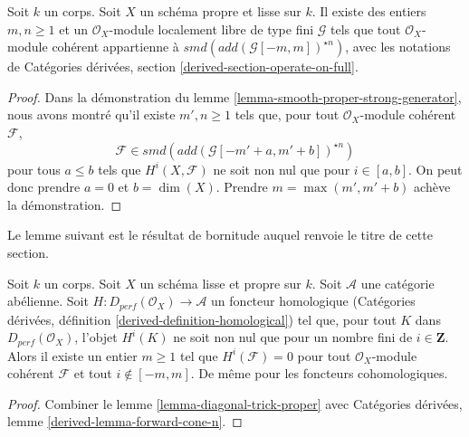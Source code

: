 \begin{lemma}
\label{lemma-diagonal-trick-proper}
Soit $k$ un corps. Soit $X$ un schéma propre et lisse sur $k$.
Il existe des entiers $m, n \geq 1$ et un
$\mathcal{O}_X$-module localement libre de type fini $\mathcal{G}$ tels que tout
$\mathcal{O}_X$-module cohérent appartienne à $smd(add(\mathcal{G}[-m, m])^{\star n})$,
avec les notations de Catégories dérivées, section
\ref{derived-section-operate-on-full}.
\end{lemma}

\begin{proof}
Dans la démonstration du lemme \ref{lemma-smooth-proper-strong-generator},
nous avons montré qu'il existe $m', n \geq 1$ tels que, pour tout
$\mathcal{O}_X$-module cohérent $\mathcal{F}$,
$$
\mathcal{F} \in smd(add(\mathcal{G}[-m' + a, m' + b])^{\star n})
$$
pour tous $a \leq b$ tels que $H^i(X, \mathcal{F})$ ne soit non nul que
pour $i \in [a, b]$. On peut donc prendre $a = 0$ et $b = \dim(X)$.
Prendre $m = \max(m', m' + b)$ achève la démonstration.
\end{proof}

\noindent
Le lemme suivant est le résultat de bornitude auquel renvoie
le titre de cette section.

\begin{lemma}
\label{lemma-boundedness}
Soit $k$ un corps. Soit $X$ un schéma lisse et propre sur $k$.
Soit $\mathcal{A}$ une catégorie abélienne. Soit
$H : D_{perf}(\mathcal{O}_X) \to \mathcal{A}$ un foncteur homologique
(Catégories dérivées, définition \ref{derived-definition-homological})
tel que, pour tout $K$ dans $D_{perf}(\mathcal{O}_X)$, l'objet
$H^i(K)$ ne soit non nul que pour un nombre fini de $i \in \mathbf{Z}$.
Alors il existe un entier $m \geq 1$ tel que
$H^i(\mathcal{F}) = 0$ pour tout $\mathcal{O}_X$-module cohérent
$\mathcal{F}$ et tout $i \not \in [-m, m]$.
De même pour les foncteurs cohomologiques.
\end{lemma}

\begin{proof}
Combiner le lemme \ref{lemma-diagonal-trick-proper} avec
Catégories dérivées, lemme \ref{derived-lemma-forward-cone-n}.
\end{proof}

